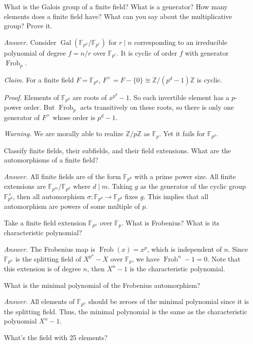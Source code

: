 \documentclass{mathproblems}
\newcommand\Z{\mathbb{Z}}
\newcommand\F{\mathbb{F}}
\DeclareMathOperator{\Gal}{Gal}
\begin{document}
\begin{questions}
\miquestion
{\color{blue} What is the Galois group of a finite field? What is a generator? How many elements does a finite field have? What can you say about the multiplicative group? Prove it.}

\textit{Answer.}
Consider $\Gal(\F_{p^n}/\F_{p^r})$ for $r\mid n$ corresponding to an irreducible polynomial of degree $f=n/r$ over $\F_{p^r}$. It is cyclic of order $f$ with generator $\operatorname{Frob}_{p}$.

\textit{Claim.}
For a finite field $F=\F_{p^d}$, $F^\times=F-\{0\}\cong \Z/(p^d-1) \Z$ is cyclic.

\textit{Proof.}
Elements of $\F_{p^d}$ are roots of $x^{p^d}-1$. So each invertible element has a $p$-power order. But $\operatorname{Frob}_p$ acts transitively on these roots, so there is only one generator of $F^\times$ whose order is $p^d-1$.

{\color{red} \textit{Warning.} We are morally able to realize $\Z/p\Z$ as $\F_{p}$. Yet it fails for $\F_{p^d}$.}

\miquestion
{\color{blue} Classify finite fields, their subfields, and their field extensions. What are the automorphisms of a finite field?}

\textit{Answer.}
All finite fields are of the form $\F_{p^d}$ with a prime power size. All finite extensions are $\F_{p^m}/\F_{p^d}$ where $d\mid m$. Taking $g$ as the generator of the cyclic group $\F_{p^d}^\times$, then all automorphism $\sigma: \F_{p^d}\to \F_{p^d}$ fixes $g$. This implies that all automorphism are powers of some multiple of $p$.

\miquestion
{\color{blue} Take a finite field extension $\F_{p^{n}}$ over $\F_{p}$. What is Frobenius? What is its characteristic polynomial?}

\textit{Answer.}
The Frobenius map is $\operatorname{Frob}(x)=x^p$, which is independent of $n$. Since $\F_{p^n}$ is the splitting field of $X^{p^n}-X$ over $\F_p$, we have $\operatorname{Frob}^n-1=0$. Note that this extension is of degree $n$, then $X^n-1$ is the characteristic polynomial.

\miquestion
{\color{blue} What is the minimal polynomial of the Frobenius automorphism?}

\textit{Answer.}
All elements of $\F_{p^n}$ should be zeroes of the minimal polynomial since it is the splitting field. Thus, the minimal polynomial is the same as the characteristic polynomial $X^n-1$.

\miquestion
{\color{blue} What's the field with 25 elements?}


\end{questions}
\end{document}
